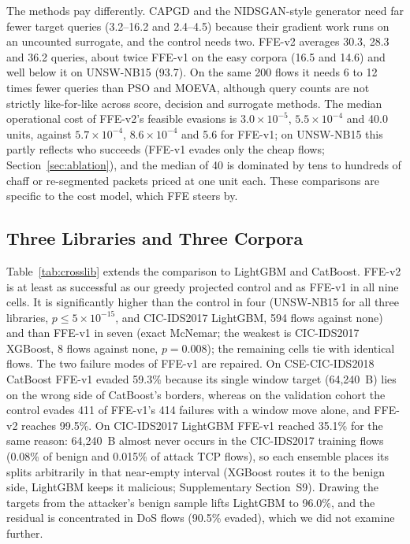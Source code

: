 The methods pay differently. CAPGD and the NIDSGAN-style generator need far fewer target queries (3.2--16.2 and 2.4--4.5) because their gradient work runs on an uncounted surrogate, and the control needs two. FFE-v2 averages 30.3, 28.3 and 36.2 queries, about twice FFE-v1 on the easy corpora (16.5 and 14.6) and well below it on UNSW-NB15 (93.7). On the same 200 flows it needs 6 to 12 times fewer queries than PSO and MOEVA, although query counts are not strictly like-for-like across score, decision and surrogate methods. The median operational cost of FFE-v2's feasible evasions is $3.0\times10^{-5}$, $5.5\times10^{-4}$ and 40.0 units, against $5.7\times10^{-4}$, $8.6\times10^{-4}$ and 5.6 for FFE-v1; on UNSW-NB15 this partly reflects who succeeds (FFE-v1 evades only the cheap flows; Section~\ref{sec:ablation}), and the median of 40 is dominated by tens to hundreds of chaff or re-segmented packets priced at one unit each. These comparisons are specific to the cost model, which FFE steers by.

\subsection{Three Libraries and Three Corpora}
\label{sec:multidataset_results}

\begin{table}[!htbp]
\linespread{1}\selectfont
\centering
\caption{Real ASR (\%) on the 1,000-flow test cohorts (CatBoost: flows it detects), with clean test accuracy and mean queries per flow ($q$). Single frozen evaluation.}\label{tab:crosslib}
\linespread{1}\selectfont
\resizebox{\textwidth}{!}{%
%
}
\end{table}

Table~\ref{tab:crosslib} extends the comparison to LightGBM and CatBoost. FFE-v2 is at least as successful as our greedy projected control and as FFE-v1 in all nine cells. It is significantly higher than the control in four (UNSW-NB15 for all three libraries, $p\le5\times10^{-15}$, and CIC-IDS2017 LightGBM, 594 flows against none) and than FFE-v1 in seven (exact McNemar; the weakest is CIC-IDS2017 XGBoost, 8 flows against none, $p=0.008$); the remaining cells tie with identical flows. The two failure modes of FFE-v1 are repaired. On CSE-CIC-IDS2018 CatBoost FFE-v1 evaded 59.3\% because its single window target (64,240~B) lies on the wrong side of CatBoost's borders, whereas on the validation cohort the control evades 411 of FFE-v1's 414 failures with a window move alone, and FFE-v2 reaches 99.5\%. On CIC-IDS2017 LightGBM FFE-v1 reached 35.1\% for the same reason: 64,240~B almost never occurs in the CIC-IDS2017 training flows (0.08\% of benign and 0.015\% of attack TCP flows), so each ensemble places its splits arbitrarily in that near-empty interval (XGBoost routes it to the benign side, LightGBM keeps it malicious; Supplementary Section~S9). Drawing the targets from the attacker's benign sample lifts LightGBM to 96.0\%, and the residual is concentrated in DoS flows (90.5\% evaded), which we did not examine further.

